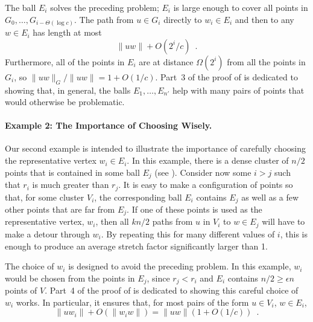\documentclass{patmorin}
\begin{document}
The ball $E_i$ solves the preceding problem; $E_i$ is large enough
to cover all points in $G_0,\ldots,G_{i-\Theta(\log c)}$.  The path
from $u\in G_i$ directly to $w_i\in E_i$ and then to any $w\in E_i$
has length at most
\[
    \|uw\| + O(2^{i}/c) \enspace .
\]
Furthermore, all of the points in $E_i$ are at distance $\Omega(2^i)$ from
all the points in $G_i$, so $\|uw\|_G/\|uw\| = 1+O(1/c)$.  Part~3 of the
proof of  is dedicated to showing that, in general,
the balls $E_1,\ldots,E_{n'}$ help with many pairs of points that would
otherwise be problematic.
\paragraph{Example 2: The Importance of Choosing Wisely.}
Our second example is intended to illustrate the importance of carefully
choosing the representative vertex $w_i\in E_i$.   In this example, there
is a dense cluster of $n/2$ points that is contained in some ball $E_j$
(see ).  Consider now some $i>j$ such that $r_i$ is
much greater than $r_j$.  It is easy to make a configuration of points so
that, for some cluster $V_i$, the corresponding ball $E_i$ contains $E_j$
as well as a few other points that are far from $E_j$. If one of these
points is used as the representative vertex, $w_i$, then all $kn/2$ paths
from $u$ in $V_i$ to $w\in E_j$ will have to make a detour through $w_i$.
By repeating this for many different values of $i$, this is enough to
produce an average stretch factor significantly larger than 1.

The choice of $w_i$ is designed to avoid the preceding problem.  In this
example, $w_i$ would be chosen from the points in $E_j$, since $r_j <
r_i$ and $E_i$ contains $n/2\ge \epsilon n$ points of $V$.  Part~4 of
the proof of  is dedicated to showing this careful
choice of $w_i$ works.  In particular, it ensures that, for most pairs
of the form $u\in V_i$, $w\in E_i$,
\[
    \|uw_i\| + O(\|w_iw\|) = \|uw\|(1+O(1/c)) \enspace .
\]

\end{document}
